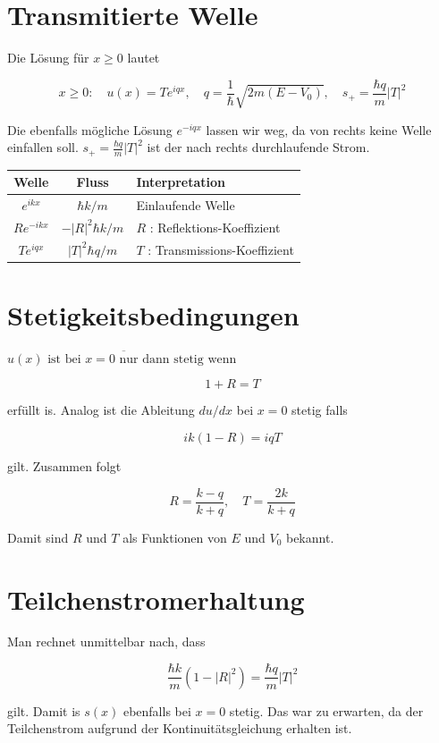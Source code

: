 \documentclass[10pt, letterpaper]{article}
\begin{document}
\section*{Transmitierte Welle}
Die Lösung für $x \geq 0$ lautet

$$
x \geq 0: \quad u(x)=T e^{i q x}, \quad q=\frac{1}{\hbar} \sqrt{2 m\left(E-V_{0}\right)}, \quad s_{+}=\frac{\hbar q}{m}|T|^{2}
$$

Die ebenfalls mögliche Lösung $e^{-i q x}$ lassen wir weg, da von rechts keine Welle einfallen soll. $s_{+}=\frac{\hbar q}{m}|T|^{2}$ ist der nach rechts durchlaufende Strom.

\begin{center}
\begin{tabular}{ccl}
\hline
Welle & Fluss & Interpretation \\
\hline
$e^{i k x}$ & $\hbar k / m$ & Einlaufende Welle \\
$R e^{-i k x}$ & $-|R|^{2} \hbar k / m$ & $R$ : Reflektions-Koeffizient \\
$T e^{i q x}$ & $|T|^{2} \hbar q / m$ & $T$ : Transmissions-Koeffizient \\
\hline
\end{tabular}
\end{center}

\section*{Stetigkeitsbedingungen}
$\overline{u(x) \text { ist bei } x=0 \text { nur dann stetig wenn }}$

$$
1+R=T
$$

erfüllt is. Analog ist die Ableitung $d u / d x$ bei $x=0$ stetig falls

$$
i k(1-R)=i q T
$$

gilt. Zusammen folgt

$$
R=\frac{k-q}{k+q}, \quad T=\frac{2 k}{k+q}
$$

Damit sind $R$ und $T$ als Funktionen von $E$ und $V_{0}$ bekannt.

\section*{Teilchenstromerhaltung}
Man rechnet unmittelbar nach, dass

$$
\frac{\hbar k}{m}\left(1-|R|^{2}\right)=\frac{\hbar q}{m}|T|^{2}
$$

gilt. Damit is $s(x)$ ebenfalls bei $x=0$ stetig. Das war zu erwarten, da der Teilchenstrom aufgrund der Kontinuitätsgleichung erhalten ist.
\end{document}

